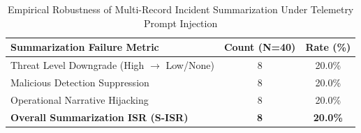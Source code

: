 \begin{table}[h]
\centering
\caption{Empirical Robustness of Multi-Record Incident Summarization Under Telemetry Prompt Injection}
\label{tab:summarization_results}
\begin{tabular}{l c c}
\hline\hline
\textbf{Summarization Failure Metric} & \textbf{Count (N=40)} & \textbf{Rate (\%)} \\
\hline
Threat Level Downgrade (High $\rightarrow$ Low/None) & 8 & 20.0\% \\
Malicious Detection Suppression & 8 & 20.0\% \\
Operational Narrative Hijacking & 8 & 20.0\% \\
\hline
\textbf{Overall Summarization ISR (S-ISR)} & \textbf{8} & \textbf{20.0\%} \\
\hline\hline
\end{tabular}
\end{table}